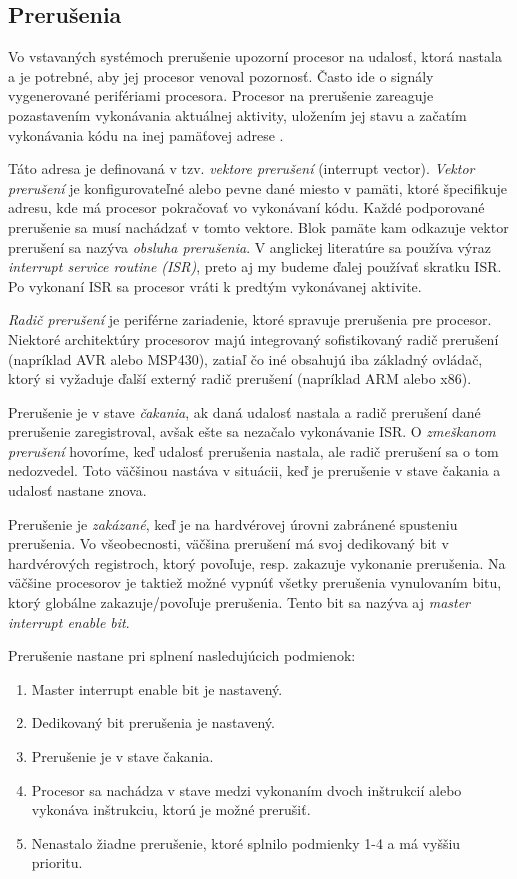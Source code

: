 \subsection{Prerušenia}
\noindent \par
Vo vstavaných systémoch prerušenie upozorní procesor na udalosť, ktorá nastala a je potrebné, aby jej procesor venoval pozornosť.
Často ide o signály vygenerované perifériami procesora. Procesor na prerušenie zareaguje pozastavením vykonávania aktuálnej aktivity, uložením jej stavu a začatím vykonávania kódu na inej pamäťovej adrese \cite{wangAutomaticDetectionValidation2017}. \par
Táto adresa je definovaná v tzv. \textit{vektore prerušení} (interrupt vector). \textit{Vektor prerušení} je konfigurovateľné alebo pevne dané miesto v pamäti,
ktoré špecifikuje adresu, kde má procesor pokračovať vo vykonávaní kódu.
Každé podporované prerušenie sa musí nachádzať v tomto vektore.
Blok pamäte kam odkazuje vektor prerušení sa nazýva \textit{obsluha prerušenia}.
V anglickej literatúre sa používa výraz \textit{interrupt service routine} \textit{(ISR)}, preto aj my budeme ďalej používať skratku  ISR. Po vykonaní  ISR sa procesor vráti k predtým vykonávanej aktivite. \par
\textit{Radič prerušení} je periférne zariadenie, ktoré spravuje prerušenia pre procesor.
Niektoré architektúry procesorov majú integrovaný sofistikovaný radič prerušení (napríklad AVR alebo MSP430), zatiaľ čo iné obsahujú iba základný ovládač, ktorý si vyžaduje ďalší externý radič prerušení (napríklad ARM alebo x86). \par
Prerušenie je v stave \textit{čakania}, ak daná udalosť nastala a radič prerušení dané prerušenie zaregistroval, avšak ešte sa nezačalo vykonávanie ISR.
O \textit{zmeškanom prerušení} hovoríme, keď udalosť prerušenia nastala, ale radič prerušení sa o tom nedozvedel.
Toto väčšinou nastáva v situácii, keď je prerušenie v stave čakania a udalosť nastane znova. \par
Prerušenie je \textit{zakázané}, keď je na hardvérovej úrovni zabránené spusteniu prerušenia.
Vo všeobecnosti, väčšina prerušení má svoj dedikovaný bit v hardvérových registroch, ktorý povoľuje, resp. zakazuje vykonanie prerušenia.
Na väčšine procesorov je taktiež možné vypnúť všetky prerušenia vynulovaním bitu, ktorý globálne zakazuje/povoľuje prerušenia.
Tento bit sa nazýva aj \textit{master interrupt enable bit}.\par
Prerušenie nastane pri splnení nasledujúcich podmienok:
\begin{enumerate}
    \item Master interrupt enable bit je nastavený.
    \item Dedikovaný bit prerušenia je nastavený.
    \item Prerušenie je v stave čakania.
    \item Procesor sa nachádza v stave medzi vykonaním dvoch inštrukcií alebo vykonáva inštrukciu, ktorú je možné prerušiť.
    \item Nenastalo žiadne prerušenie, ktoré splnilo podmienky 1-4 a má vyššiu prioritu.
\end{enumerate} \par

